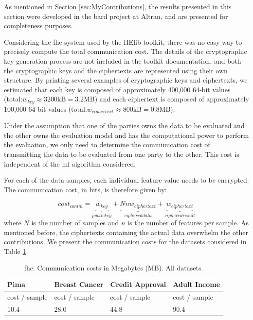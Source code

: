 As mentioned in Section \ref{sec:MyContributions}, the results presented in this section were developed in the \ac{bard} project at Altran, and are presented for completeness purposes.

Considering the \ac{fhe} system used by the HElib toolkit, there was no easy way to precisely compute the total communication cost. The details of the cryptographic key generation process are not included in the toolkit documentation, and both the cryptographic keys and the ciphertexts are represented using their own structure. By printing several examples of cryptographic keys and ciphertexts, we estimated that each key is composed of approximately 400,000 64-bit values (total:$w_{key}\approx 3200\text{kB}=3.2\text{MB}$) and each ciphertext is composed of approximately 100,000 64-bit values (total:$w_{ciphertext}\approx 800\text{kB}=0.8\text{MB}$).

Under the assumption that one of the parties owns the data to be evaluated and the other owns the evaluation model and has the computational power to perform the evaluation, we only need to determine the communication cost of transmitting the data to be evaluated from one party to the other. This cost is independent of the \ac{ml} algorithm considered.

For each of the data samples, each individual feature value needs to be encrypted. The communication cost, in bits, is therefore given by:

\begin{equation}
\label{eq:FHE_commCost}
cost_{comm} = \underbrace{w_{key}}_{public key} + \underbrace{Nnw_{ciphertext}}_{ciphered data} + \underbrace{w_{ciphertext}}_{ciphered result}
\end{equation}
where $N$ is the number of samples and $n$ is the number of features per sample. As mentioned before, the ciphertexts containing the actual data overwhelm the other contributions. We present the communication costs for the datasets considered in Table \ref{table:FHECommCost}.


\begin{table}[htp]
\centering
\caption{\acs{fhe}. Communication costs in Megabytes (MB). All datasets.}
\label{table:FHECommCost}
\begin{tabular}{|l|l|l|l|}
\hline
\textbf{Pima}          & \textbf{Breast Cancer} & \textbf{Credit Approval} & \textbf{Adult Income}   \\ \hline
cost / sample & cost / sample & cost / sample   & cost / sample  \\ \hline
10.4   & 28.0  & 44.8  & 90.4   \\ \hline
\end{tabular}
\end{table}

